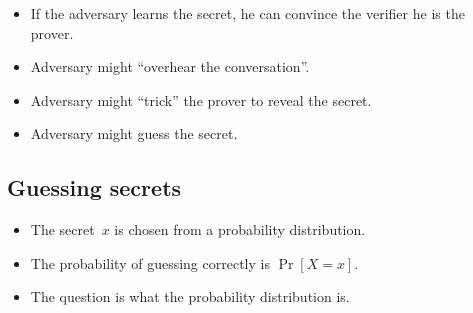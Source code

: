 \begin{frame}
  \begin{remark}
    \begin{itemize}
      \item If the adversary learns the secret, he can convince the verifier he 
        is the prover.
    \end{itemize}
  \end{remark}

  \begin{example}
    \begin{itemize}
      \item Adversary might \enquote{overhear the conversation}.
      \item Adversary might \enquote{trick} the prover to reveal the secret.
      \item Adversary might guess the secret.
    \end{itemize}
  \end{example}
\end{frame}

\subsection{Guessing secrets}

\begin{frame}
  \begin{idea}
    \begin{itemize}
      \item The secret~\(x\) is chosen from a probability distribution.
      \item The probability of guessing correctly is \(\Pr[X = x]\).
    \end{itemize}
  \end{idea}

  \begin{remark}
    \begin{itemize}
      \item The question is what the probability distribution is.
    \end{itemize}
  \end{remark}
\end{frame}

